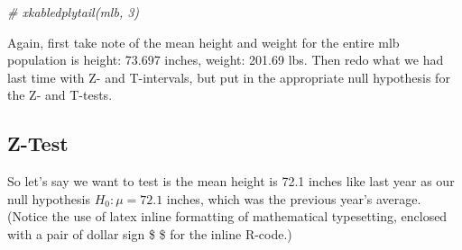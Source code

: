 \documentclass[
]{article}
\newenvironment{Shaded}{\begin{snugshade}}{\end{snugshade}}
\newcommand{\AttributeTok}[1]{\textcolor[rgb]{0.77,0.63,0.00}{#1}}
\newcommand{\CommentTok}[1]{\textcolor[rgb]{0.56,0.35,0.01}{\textit{#1}}}
\newcommand{\ConstantTok}[1]{\textcolor[rgb]{0.00,0.00,0.00}{#1}}
\newcommand{\DecValTok}[1]{\textcolor[rgb]{0.00,0.00,0.81}{#1}}
\newcommand{\FunctionTok}[1]{\textcolor[rgb]{0.00,0.00,0.00}{#1}}
\newcommand{\NormalTok}[1]{#1}
\newcommand{\OtherTok}[1]{\textcolor[rgb]{0.56,0.35,0.01}{#1}}
\newcommand{\SpecialCharTok}[1]{\textcolor[rgb]{0.00,0.00,0.00}{#1}}
\begin{document}
\begin{Shaded}
\begin{Highlighting}[]
\CommentTok{\# xkabledplytail(mlb, 3)}
\end{Highlighting}
\end{Shaded}

Again, first take note of the mean height and weight for the entire mlb
population is height: 73.697 inches, weight: 201.69 lbs. Then redo what
we had last time with Z- and T-intervals, but put in the appropriate
null hypothesis for the Z- and T-tests.

\begin{Shaded}
\end{Shaded}

\hypertarget{z-test}{%
\subsection{Z-Test}\label{z-test}}

So let's say we want to test is the mean height is 72.1 inches like last
year as our null hypothesis \(H_0: \mu = 72.1\) inches, which was the
previous year's average. (Notice the use of latex inline formatting of
mathematical typesetting, enclosed with a pair of dollar sign \$ \$ for
the inline R-code.)
\end{document}
